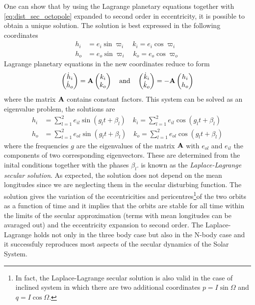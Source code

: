 \documentclass[ twoside,openright,titlepage,numbers=noenddot,headinclude,%
                footinclude=true,cleardoublepage=empty,abstractoff, %
                BCOR=5mm,paper=a4,fontsize=11pt,%
                american,%
                ]{scrreprt}
\begin{document}
One can show \citep{murray} that by using the Lagrange planetary 
equations together with \cref{eq:dist_sec_octopole} expanded
to second order in eccentricity, it is possible to obtain
a unique solution. The solution is best expressed in the 
following coordinates
\begin{align}
    h_i&=e_i\sin\varpi_i\quad k_i=e_i\cos\varpi_i\\
    h_o&=e_o\sin\varpi_i\quad k_o=e_o\cos\varpi_o
\end{align}
Lagrange planetary equations in the new coordinates reduce to form
\begin{equation}
    \begin{pmatrix}
        \dot{h}_i\\
        \dot{h}_o
    \end{pmatrix}
    = \boldsymbol{\mathbf{A}}\begin{pmatrix}
        k_i\\
        k_o
    \end{pmatrix}
\quad    \text{and} \quad
\begin{pmatrix}
        \dot{k}_i\\
        \dot{k}_o
    \end{pmatrix}
    = -\boldsymbol{\mathbf{A}}\begin{pmatrix}
        h_i\\
        h_o
    \end{pmatrix}
\end{equation}
where the matrix $\boldsymbol{\mathbf{A}}$ contains constant factors. This
system can be solved as an eigenvalue problem, the solutions are
\begin{equation}
\begin{aligned}
    h_i&=\sum^2_{l=1}e_{il}\sin(g_lt+\beta_l)\quad
    k_i=\sum^2_{l=1}e_{il}\cos(g_lt+\beta_l)\\
    h_o&=\sum^2_{l=1}e_{ol}\sin(g_lt+\beta_l)\quad
    k_o=\sum^2_{l=1}e_{ol}\cos(g_lt+\beta_l)
\end{aligned}
    \label{eq:laplace_lagrange}
\end{equation}
where the frequencies $g$ are the eigenvalues of the matrix $\boldsymbol{\mathbf{A}}$
with $e_{ol}$ and $e_{il}$ the components of two corresponding 
eigenvectors. These are determined from the inital conditions together
with the phases $\beta_l$.  is known as
the \emph{Laplace-Lagrange secular solution}. As expected, the solution
does not depend on the mean longitudes since we are neglecting them
in the secular disturbing function. The solution gives the variation
of the eccentricities and pericentres\footnote{In fact, the 
Laplace-Lagrange secular solution is also valid in the case of inclined
system in which there are two additional coordinates $p=I\sin\Omega$
and $q=I\cos\Omega$.}of the two orbits as a function
of time and it implies that the orbits are stable for all time within
the limits of the secular approximation (terms with mean longitudes
can be avaraged out) and the eccentricity expansion to second order.
The Laplace-Lagrange holds not only in the three body case but
also in the N-body case and it successfuly reproduces most aspects
of the secular dynamics of the Solar System.
\end{document}
